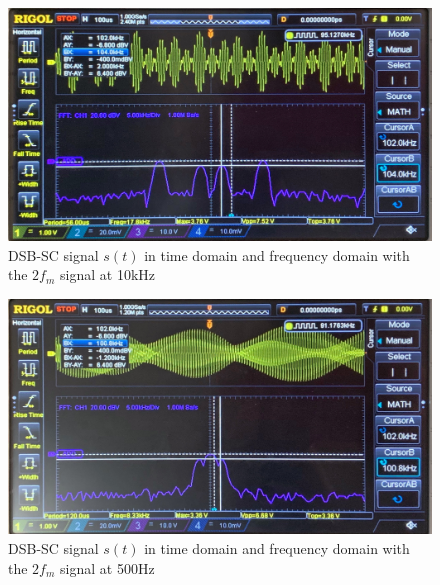 \documentclass[11pt]{article}
\begin{document}
\begin{enumerate}[label=(\alph*)]
\begin{figure}[H]
    \centering
    \includegraphics[scale = 0.18]{Q2d10kHz.jpg}
    \caption{\label{fig:q2d10k}DSB-SC signal $s(t)$ in time domain and frequency domain with the $2f_m$ signal at 10kHz}
\end{figure}
\begin{figure}[H]
    \centering
    \includegraphics[scale = 0.21]{Q2d500Hz.jpg}
    \caption{\label{fig:q2d500}DSB-SC signal $s(t)$ in time domain and frequency domain with the $2f_m$ signal at 500Hz}
\end{figure}

\end{enumerate}
\end{document}
